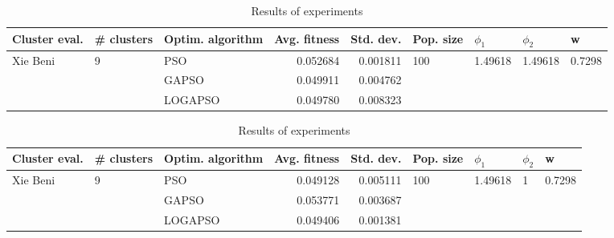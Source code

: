 \documentclass{article}
\begin{document}
\begin{table}
\centering
\caption{Results of experiments}
\begin{tabular}{lllrrllll}
\toprule
            Cluster eval. &        \# clusters & Optim. algorithm &  Avg. fitness &  Std. dev. &            Pop. size &               $\phi_{1}$ &               $\phi_{2}$ &                       w \\
\midrule
\multirow{3}{*}{Xie Beni} & \multirow{3}{*}{9} &              PSO &      0.052684 &   0.001811 & \multirow{3}{*}{100} & \multirow{3}{*}{1.49618} & \multirow{3}{*}{1.49618} & \multirow{3}{*}{0.7298} \\
                          &                    &            GAPSO &      0.049911 &   0.004762 &                      &                          &                          &                         \\
                          &                    &          LOGAPSO &      0.049780 &   0.008323 &                      &                          &                          &                         \\
\bottomrule
\end{tabular}
\end{table}
\begin{table}
\centering
\caption{Results of experiments}
\begin{tabular}{lllrrllll}
\toprule
            Cluster eval. &        \# clusters & Optim. algorithm &  Avg. fitness &  Std. dev. &            Pop. size &               $\phi_{1}$ &         $\phi_{2}$ &                       w \\
\midrule
\multirow{3}{*}{Xie Beni} & \multirow{3}{*}{9} &              PSO &      0.049128 &   0.005111 & \multirow{3}{*}{100} & \multirow{3}{*}{1.49618} & \multirow{3}{*}{1} & \multirow{3}{*}{0.7298} \\
                          &                    &            GAPSO &      0.053771 &   0.003687 &                      &                          &                    &                         \\
                          &                    &          LOGAPSO &      0.049406 &   0.001381 &                      &                          &                    &                         \\
\bottomrule
\end{tabular}
\end{table}
\end{document}
